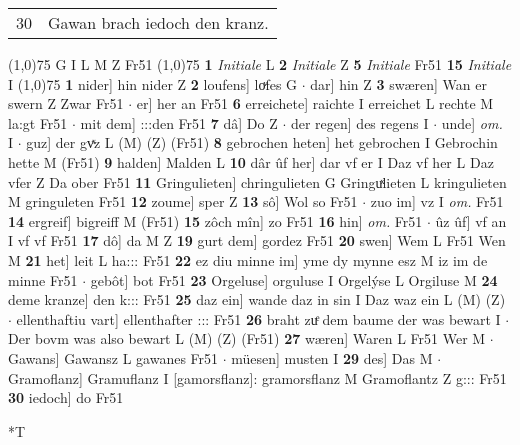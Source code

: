 \documentclass[8pt,a4paper,notitlepage]{article}
\begin{document}
\begin{table}[ht]
\begin{minipage}[t]{0.5\linewidth}
\begin{tabular}{rl}
30 & Gawan brach iedoch den kranz.\\ 
\end{tabular}
\scriptsize
\line(1,0){75} \newline
G I L M Z Fr51 \newline
\line(1,0){75} \newline
\textbf{1} \textit{Initiale} L  \textbf{2} \textit{Initiale} Z  \textbf{5} \textit{Initiale} Fr51  \textbf{15} \textit{Initiale} I  \newline
\line(1,0){75} \newline
\textbf{1} nider] hin nider Z \textbf{2} loufens] loͮfes G  $\cdot$ dar] hin Z \textbf{3} swæren] Wan er swern Z Zwar Fr51  $\cdot$ er] her an Fr51 \textbf{6} erreichete] raichte I erreichet L rechte M la:gt Fr51  $\cdot$ mit dem] :::den Fr51 \textbf{7} dâ] Do Z  $\cdot$ der regen] des regens I  $\cdot$ unde] \textit{om.} I  $\cdot$ guz] der gvͯz L (M) (Z) (Fr51) \textbf{8} gebrochen heten] het gebrochen I Gebrochin hette M (Fr51) \textbf{9} halden] Malden L \textbf{10} dâr ûf her] dar vf er I Daz vf her L Daz vfer Z Da ober Fr51 \textbf{11} Gringulieten] chringulieten G Gringuͯlieten L kringulieten M gringuleten Fr51 \textbf{12} zoume] sper Z \textbf{13} sô] Wol so Fr51  $\cdot$ zuo im] vz I \textit{om.} Fr51 \textbf{14} ergreif] bigreiff M (Fr51) \textbf{15} zôch mîn] zo Fr51 \textbf{16} hin] \textit{om.} Fr51  $\cdot$ ûz ûf] vf an I vf vf Fr51 \textbf{17} dô] da M Z \textbf{19} gurt dem] gordez Fr51 \textbf{20} swen] Wem L Fr51 Wen M \textbf{21} het] leit L ha::: Fr51 \textbf{22} ez diu minne im] yme dy mynne esz M iz im de minne Fr51  $\cdot$ gebôt] bot Fr51 \textbf{23} Orgeluse] orguluse I Orgelýse L Orgiluse M \textbf{24} deme kranze] den k::: Fr51 \textbf{25} daz ein] wande daz in sin I Daz waz ein L (M) (Z)  $\cdot$ ellenthaftiu vart] ellenthafter ::: Fr51 \textbf{26} braht zuͤ dem baume der was bewart I  $\cdot$ Der bovm was also bewart L (M) (Z) (Fr51) \textbf{27} wæren] Waren L Fr51 Wer M  $\cdot$ Gawans] Gawansz L gawanes Fr51  $\cdot$ müesen] musten I \textbf{29} des] Das M  $\cdot$ Gramoflanz] Gramuflanz I [gamorsflanz]: gramorsflanz M Gramoflantz Z g::: Fr51 \textbf{30} iedoch] do Fr51 \newline
\end{minipage}
\hspace{0.5cm}
\begin{minipage}[t]{0.5\linewidth}
\small
\begin{center}*T
\end{center}
\begin{tabular}{rl}

\end{tabular}
\end{minipage}
\end{table}
\end{document}
